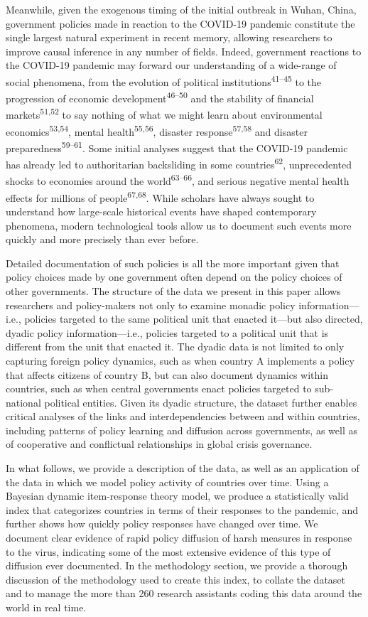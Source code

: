 \documentclass[]{article}
\begin{document}
Meanwhile, given the exogenous timing of the initial outbreak in Wuhan, China, government policies made in reaction to the COVID-19 pandemic constitute the single largest natural experiment in recent memory, allowing researchers to improve causal inference in any number of fields. Indeed, government reactions to the COVID-19 pandemic may forward our understanding of a wide-range of social phenomena, from the evolution of political institutions\textsuperscript{41--45} to the progression of economic development\textsuperscript{46--50} and the stability of financial markets\textsuperscript{51,52} to say nothing of what we might learn about environmental economics\textsuperscript{53,54}, mental health\textsuperscript{55,56}, disaster response\textsuperscript{57,58} and disaster preparedness\textsuperscript{59--61}. Some initial analyses suggest that the COVID-19 pandemic has already led to authoritarian backsliding in some countries\textsuperscript{62}, unprecedented shocks to economies around the world\textsuperscript{63--66}, and serious negative mental health effects for millions of people\textsuperscript{67,68}. While scholars have always sought to understand how large-scale historical events have shaped contemporary phenomena, modern technological tools allow us to document such events more quickly and more precisely than ever before.

Detailed documentation of such policies is all the more important given that policy choices made by one government often depend on the policy choices of other governments. The structure of the data we present in this paper allows researchers and policy-makers not only to examine monadic policy information---i.e., policies targeted to the same political unit that enacted it---but also directed, dyadic policy information---i.e., policies targeted to a political unit that is different from the unit that enacted it. The dyadic data is not limited to only capturing foreign policy dynamics, such as when country A implements a policy that affects citizens of country B, but can also document dynamics within countries, such as when central governments enact policies targeted to sub-national political entities. Given its dyadic structure, the dataset further enables critical analyses of the links and interdependencies between and within countries, including patterns of policy learning and diffusion across governments, as well as of cooperative and conflictual relationships in global crisis governance.

In what follows, we provide a description of the data, as well as an application of the data in which we model policy activity of countries over time. Using a Bayesian dynamic item-response theory model, we produce a statistically valid index that categorizes countries in terms of their responses to the pandemic, and further shows how quickly policy responses have changed over time. We document clear evidence of rapid policy diffusion of harsh measures in response to the virus, indicating some of the most extensive evidence of this type of diffusion ever documented. In the methodology section, we provide a thorough discussion of the methodology used to create this index, to collate the dataset and to manage the more than 260 research assistants coding this data around the world in real time.
\end{document}
